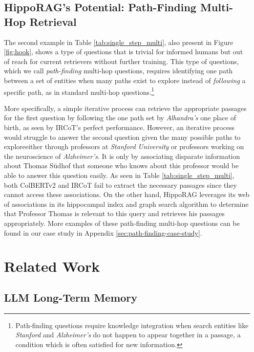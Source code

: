 \documentclass{article}
\begin{document}
\subsection{HippoRAG's Potential: Path-Finding Multi-Hop Retrieval}
\label{path_finding_case_study_main_paper}

The second example in Table \ref{tab:single_step_multi}, also present in Figure \ref{fig:hook}, shows a type of questions that is trivial for informed humans but out of reach for current retrievers without further training.
This type of questions, which we call \textit{path-finding} multi-hop questions, requires identifying one path between a set of entities when 
many paths exist to explore instead of \textit{following} a specific path, as in standard multi-hop questions.\footnote{Path-finding questions require knowledge integration when search entities like \textit{Stanford} and \textit{Alzheimer's} do not happen to appear together in a passage, a condition which is often satisfied for new information.}

More specifically, a simple iterative process can retrieve the appropriate passages for the first question by following the one path set by \textit{Alhandra's} one place of birth, as seen by IRCoT's perfect performance. 
However, an iterative process would struggle to answer the second question given the many possible paths to explore\textemdash either through professors at \textit{Stanford University} or professors working on the neuroscience of \textit{Alzheimer's}.
It is only by associating disparate information about Thomas Südhof that someone who knows about this professor would be able to answer this question easily.
As seen in Table \ref{tab:single_step_multi}, both ColBERTv2 and IRCoT fail to extract the necessary passages since they cannot access these associations.
On the other hand, HippoRAG leverages its web of associations in its hippocampal index and graph search algorithm to determine that Professor Thomas is relevant to this query and retrieves his passages appropriately.
More examples of these path-finding multi-hop questions can be found in our case study in Appendix \ref{sec:path-finding-case-study}.

\section{Related Work}

\subsection{LLM Long-Term Memory}
\end{document}
